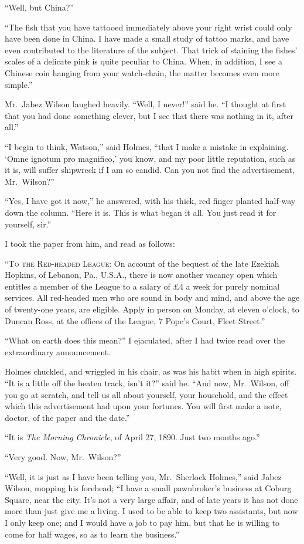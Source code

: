 “Well, but China?”

“The fish that you have tattooed immediately above your
right wrist could only have been done in China. I have made
a small study of tattoo marks, and have even contributed to
the literature of the subject. That trick of staining the fishes’
scales of a delicate pink is quite peculiar to China. When, in
addition, I see a Chinese coin hanging from your watch-chain,
the matter becomes even more simple.”

Mr.~Jabez Wilson laughed heavily. “Well, I never!” said
he. “I thought at first that you had done something clever,
but I see that there was nothing in it, after all.”

“I begin to think, Watson,” said Holmes, “that I make a
mistake in explaining. ‘Omne ignotum pro magnifico,’ you
know, and my poor little reputation, such as it is, will suffer
shipwreck if I am so candid. Can you not find the advertisement,
Mr.~Wilson?”

“Yes, I have got it now,” he answered, with his thick, red
finger planted half-way down the column. “Here it is. This
is what began it all. You just read it for yourself, sir.”

I took the paper from him, and read as follows:

“\textsc{To the Red-headed League}: On account of the bequest
of the late Ezekiah Hopkins, of Lebanon, Pa., U.S.A.,
there is now another vacancy open which entitles a member
of the League to a salary of £4 a week for purely nominal
services. All red-headed men who are sound in body and
mind, and above the age of twenty-one years, are eligible. Apply
in person on Monday, at eleven o’clock, to Duncan Ross,
at the offices of the League, 7 Pope’s Court, Fleet Street.”

“What on earth does this mean?” I ejaculated, after I had
twice read over the extraordinary announcement.

Holmes chuckled, and wriggled in his chair, as was his
habit when in high spirits. “It is a little off the beaten
track, isn’t it?” said he. “And now, Mr.~Wilson, off you go
at scratch, and tell us all about yourself, your household, and
the effect which this advertisement had upon your fortunes.
You will first make a note, doctor, of the paper and the
date.”

“It is \textit{The Morning Chronicle}, of April 27, 1890. Just two
months ago.”

“Very good. Now, Mr.~Wilson?”

“Well, it is just as I have been telling you, Mr.~Sherlock
Holmes,” said Jabez Wilson, mopping his forehead; “I have
a small pawnbroker’s business at Coburg Square, near the
city. It’s not a very large affair, and of late years it has not
done more than just give me a living. I used to be able to
keep two assistants, but now I only keep one; and I would
have a job to pay him, but that he is willing to come for half
wages, so as to learn the business.”

